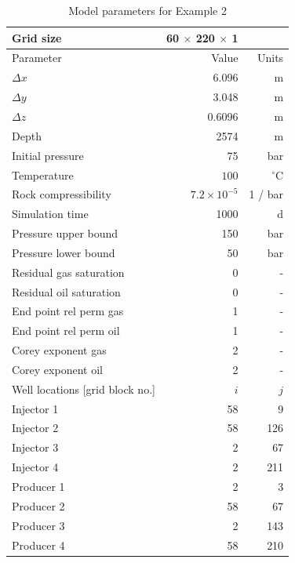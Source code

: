 \begin{table}
\centering
\caption{Model parameters for Example 2}
\begin{tabular}{|l|rr|}
\hline
Grid size                & 60 $\times$ 220 $\times$ 1 &       \\
\hline\hline
Parameter                & Value    & Units \\
\hline
$\Delta x$               & 6.096&m          \\
$\Delta y$               & 3.048&m          \\
$\Delta z$               & 0.6096&m         \\
Depth                    & 2574&m           \\
Initial pressure         & 75  & bar        \\
Temperature              &$100$ & $^\circ$C     \\
\hline
Rock compressibility     & $7.2 \times 10^{-5}$ & 1 / bar \\
Simulation time          &1000 & d          \\
Pressure upper bound     & 150 & bar        \\
Pressure lower bound     &  50 & bar        \\
\hline
Residual gas saturation  & 0 & -            \\
Residual oil saturation  & 0 & -            \\
End point rel perm gas   & 1 & -            \\
End point rel perm oil   & 1 & -            \\
Corey exponent gas       & 2 & -            \\
Corey exponent oil       & 2 & -            \\
\hline\hline
Well locations [grid block no.] & $i$ & $j$     \\
\hline
Injector 1               &   58&   9   \\
Injector 2               &   58& 126   \\
Injector 3               &    2&  67   \\
Injector 4               &    2& 211   \\
Producer 1               &    2&   3   \\
Producer 2               &   58&  67   \\
Producer 3               &    2& 143   \\
Producer 4               &   58& 210   \\
\hline
\end{tabular}
\label{table:spe10toplayer}
\end{table}



